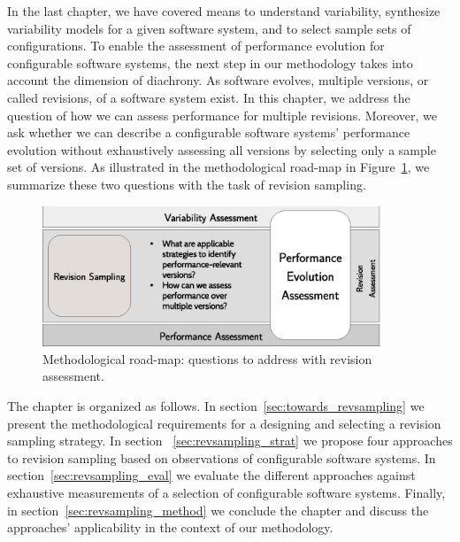 In the last chapter, we have covered means to understand variability,
synthesize variability models for a given software system, and to select sample
sets of configurations. To enable the assessment of performance evolution for
configurable software systems, the next step in our methodology takes into
account the dimension of diachrony. As software evolves, multiple versions, or
called revisions, of a software system exist. In this chapter, we address the
question of how we can assess performance for multiple revisions. Moreover, we
ask whether we can describe a configurable software systems’ performance
evolution without exhaustively assessing all versions by selecting only a
sample set of versions. As illustrated in the methodological road-map in
Figure~\ref{fig:roadmap_2}, we summarize these two questions with the task of
revision sampling.

\begin{figure}[h!]
	\centering
	\includegraphics[width=0.9\textwidth]{images/process_revassesment.eps}
	\caption{Methodological road-map: questions to address with revision
	assessment.}
	\label{fig:roadmap_2}
\end{figure}

The chapter is organized as follows. In section~\ref{sec:towards_revsampling} we
present the methodological requirements for a designing and selecting a revision sampling
strategy. In section ~\ref{sec:revsampling_strat} we propose four approaches to
revision sampling based on observations of configurable software systems. In
section~\ref{sec:revsampling_eval} we evaluate the different approaches against
exhaustive measurements of a selection of configurable software systems.
Finally, in section~\ref{sec:revsampling_method} we conclude the chapter and
discuss the approaches' applicability in the context of our methodology.

